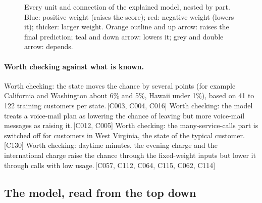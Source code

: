 \documentclass[a4paper,10pt]{article}
\newif\ifreviewmarks
\newcommand{\reviewrule}{\noindent{\color{BrickRed}\rule{\linewidth}{0.8pt}}}
\newenvironment{drafted}[1][]{%
  \ifreviewmarks\par\addvspace{\medskipamount}\reviewrule\par\nopagebreak
  \noindent{\color{BrickRed}\sffamily\footnotesize\textbf{Thesis Draft}\quad #1\hfill review}\par\nopagebreak\smallskip\fi}{%
  \ifreviewmarks\par\smallskip\noindent{\color{BrickRed}\sffamily\footnotesize end of thesis draft}\par\nopagebreak\reviewrule\par\medskip\fi}
\begin{document}
\begin{drafted}[plain-language layer: churn100-s2-c1]
\begin{landscape}
\begin{figure}[p]
{}%
\caption{Every unit and connection of the explained model, nested by part. Blue: positive weight (raises the score); red: negative weight (lowers it); thicker: larger weight. Orange outline and up arrow: raises the final prediction; teal and down arrow: lowers it; grey and double arrow: depends.}
\label{fig:churn100s2c1:overview}
\end{figure}
\end{landscape}
\paragraph{Worth checking against what is known.} Worth checking: the state moves the chance by several points (for example California and Washington about 6\% and 5\%, Hawaii under 1\%), based on 41 to 122 training customers per state.\,{\scriptsize\textcolor{NavyBlue}{[C003, C004, C016]}} Worth checking: the model treats a voice-mail plan as lowering the chance of leaving but more voice-mail messages as raising it.\,{\scriptsize\textcolor{NavyBlue}{[C012, C005]}} Worth checking: the many-service-calls part is switched off for customers in West Virginia, the state of the typical customer.\,{\scriptsize\textcolor{NavyBlue}{[C130]}} Worth checking: daytime minutes, the evening charge and the international charge raise the chance through the fixed-weight inputs but lower it through calls with low usage.\,{\scriptsize\textcolor{NavyBlue}{[C057, C112, C064, C115, C062, C114]}}
\subsection{The model, read from the top down}

\end{drafted}
\end{document}
